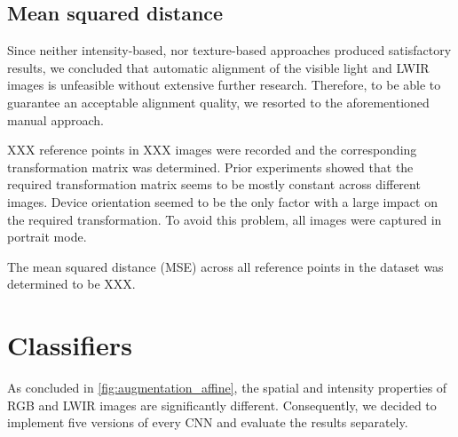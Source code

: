 \documentclass{l4proj}
\begin{document}
\subsection{Mean squared distance}

Since neither intensity-based, nor texture-based approaches produced satisfactory results, we concluded that automatic alignment of the visible light and LWIR images is unfeasible without extensive further research. Therefore, to be able to guarantee an acceptable alignment quality, we resorted to the aforementioned manual approach.

XXX reference points in XXX images were recorded and the corresponding transformation matrix was determined. Prior experiments showed that the required transformation matrix seems to be mostly constant across different images. Device orientation seemed to be the only factor with a large impact on the required transformation. To avoid this problem, all images were captured in portrait mode.

The mean squared distance (MSE) across all reference points in the dataset was determined to be XXX.


\section{Classifiers}

As concluded in \ref{fig:augmentation_affine}, the spatial and intensity properties of RGB and LWIR images are significantly different. Consequently, we decided to implement five versions of every CNN and evaluate the results separately.
\end{document}
